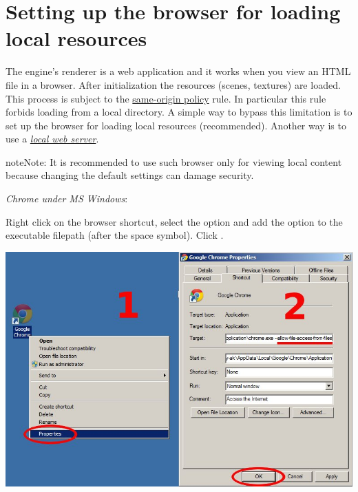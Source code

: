 \documentclass[a4paper,12pt,oneside]{sphinxmanual}
\begin{document}
\begin{DUlineblock}{0em}
\item[] 
\end{DUlineblock}


\section{Setting up the browser for loading local resources}
\label{setup:browser-for-local-loading}\label{setup:id4}
The engine's renderer is a web application and it works when you view an HTML file in a browser. After initialization the resources (scenes, textures) are loaded. This process is subject to the \href{http://en.wikipedia.org/wiki/Same-origin\_policy}{same-origin policy} rule. In particular this rule forbids loading from a local directory. A simple way to bypass this limitation is to set up the browser for loading local resources (recommended). Another way is to use a {\hyperref[problems_and_solutions:local-web-server]{\emph{local web server}}}.

\begin{notice}{note}{Note:}
It is recommended to use such browser only for viewing local content because changing the default settings can damage security.
\end{notice}

\emph{Chrome under MS Windows}:

Right click on the browser shortcut, select the  option and add the  option to the executable filepath (after the space symbol). Click .

\begin{DUlineblock}{0em}
\item[] 
\end{DUlineblock}

{\hfill\includegraphics[width=1.000\linewidth]{chrome_file_access.jpg}\hfill}
\end{document}
